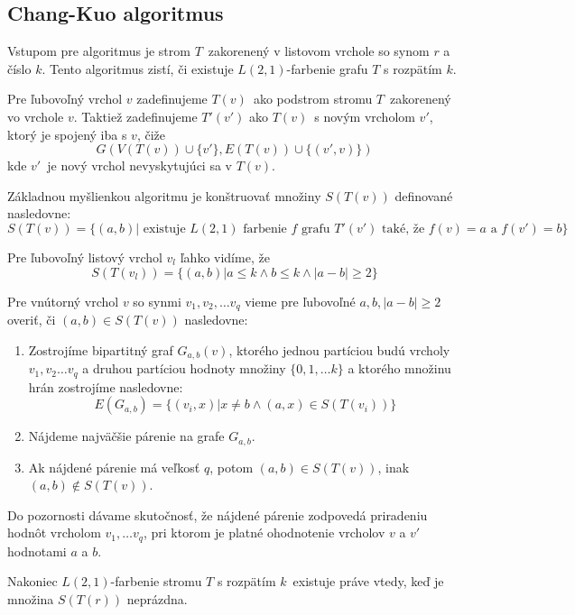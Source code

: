 \subsection{Chang-Kuo algoritmus}

Vstupom pre algoritmus je strom $T$ zakorenený v listovom vrchole so synom $r$ a číslo $k$.
Tento algoritmus zistí, či existuje $L(2,1)$-farbenie grafu $T$ s rozpätím $k$.

Pre ľubovoľný
vrchol $v$ zadefinujeme $T(v)$ ako podstrom stromu $T$ zakorenený vo vrchole $v$. Taktiež
zadefinujeme $T'(v')$ ako $T(v)$ s novým vrcholom $v'$, ktorý je spojený iba s $v$, čiže
$$ G\left(V(T(v)) \cup \{ v' \}, E(T(v)) \cup \{ (v', v)\} \right) $$
kde $v'$ je nový vrchol nevyskytujúci sa v $T(v)$.

Základnou myšlienkou algoritmu je konštruovať množiny $S(T(v))$ definované nasledovne:
$$S(T(v)) = \{ (a, b) | \textrm{ existuje } L(2,1) \textrm{ farbenie } f \textrm{ grafu } T'(v') \textrm{ také, že } f(v) = a \textrm{ a } f(v') = b\}$$

Pre ľubovoľný listový vrchol $v_l$ ľahko vidíme, že 
$$S(T(v_l)) = \{ (a, b) | a \leq k \wedge b \leq k \wedge |a - b| \ge 2\}$$

Pre vnútorný vrchol $v$ so synmi $v_1, v_2, \ldots v_q$ vieme pre ľubovoľné $a, b, |a - b| \ge 2$ overiť,
či $(a, b) \in S(T(v))$ nasledovne:

\begin{enumerate}
    \item Zostrojíme bipartitný graf $G_{a,b}(v)$, ktorého jednou partíciou budú vrcholy $v_1, v_2 \ldots v_q$ a
    druhou partíciou hodnoty množiny $\{0, 1, \ldots k\}$ a ktorého množinu hrán zostrojíme nasledovne:
    $$E(G_{a,b}) = \{ (v_i, x) | x \neq b \wedge (a, x) \in S(T(v_i))\}$$

    \item Nájdeme najväčšie párenie na grafe $G_{a,b}$.

    \item Ak nájdené párenie má veľkosť $q$, potom $(a,b) \in S(T(v))$, inak $(a,b) \notin S(T(v))$.
\end{enumerate}

Do pozornosti dávame skutočnosť, že nájdené párenie zodpovedá priradeniu hodnôt vrcholom
$v_1, \ldots v_q$, pri ktorom je platné ohodnotenie vrcholov $v$ a $v'$ hodnotami $a$ a $b$.

Nakoniec $L(2,1)$-farbenie stromu $T$ s rozpätím $k$ existuje práve vtedy, keď je množina
$S(T(r))$ neprázdna.

